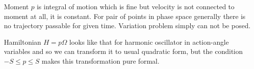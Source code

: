 Moment $ p $ is integral of motion which is fine but velocity is not connected to 
moment at all, it is constant. For pair of points in phase space generally there is
no trajectory passable for given time. Variation problem simply can not be posed.

 Hamiltonian $ H=p \Omega $ looks like that for harmonic oscillator in action-angle variables
and so we can  transform it to usual quadratic form, but the condition $  -S\le p \le S$
makes this transformation pure formal.
